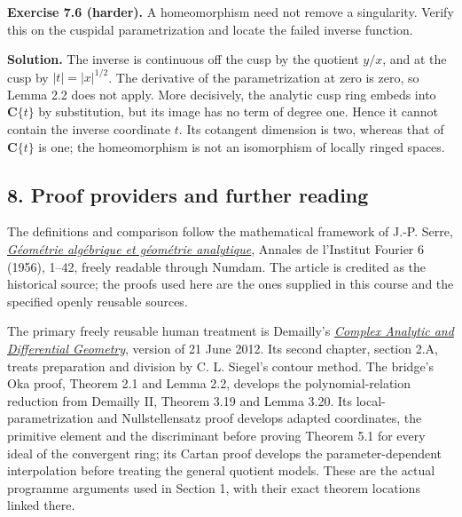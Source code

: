 \documentclass[11pt]{article}
\begin{document}
\textbf{Exercise 7.6 (harder).} A homeomorphism need not remove a
singularity. Verify this on the cuspidal parametrization and locate the
failed inverse function.

\textbf{Solution.} The inverse is continuous off the cusp by the
quotient \(y/x\), and at the cusp by \(|t|=|x|^{1/2}\). The derivative
of the parametrization at zero is zero, so Lemma 2.2 does not apply.
More decisively, the analytic cusp ring embeds into \(\mathbf C\{t\}\)
by substitution, but its image has no term of degree one. Hence it
cannot contain the inverse coordinate \(t\). Its cotangent dimension is
two, whereas that of \(\mathbf C\{t\}\) is one; the homeomorphism is not
an isomorphism of locally ringed spaces.

\subsection{8. Proof providers and further
reading}\label{proof-providers-and-further-reading}

The definitions and comparison follow the mathematical framework of
J.-P. Serre,
\href{https://www.numdam.org/item/AIF_1956__6__1_0/}{\emph{Géométrie
algébrique et géométrie analytique}}, Annales de l'Institut Fourier 6
(1956), 1--42, freely readable through Numdam. The article is credited
as the historical source; the proofs used here are the ones supplied in
this course and the specified openly reusable sources.

The primary freely reusable human treatment is Demailly's
\href{https://www-fourier.univ-grenoble-alpes.fr/~demailly/manuscripts/agbook.pdf}{\emph{Complex
Analytic and Differential Geometry}}, version of 21 June 2012. Its
second chapter, section 2.A, treats preparation and division by C. L.
Siegel's contour method. The bridge's Oka proof, Theorem 2.1 and Lemma
2.2, develops the polynomial-relation reduction from Demailly II,
Theorem 3.19 and Lemma 3.20. Its local-parametrization and
Nullstellensatz proof develops adapted coordinates, the primitive
element and the discriminant before proving Theorem 5.1 for every ideal
of the convergent ring; its Cartan proof develops the
parameter-dependent interpolation before treating the general quotient
models. These are the actual programme arguments used in Section 1, with
their exact theorem locations linked there.
\end{document}
